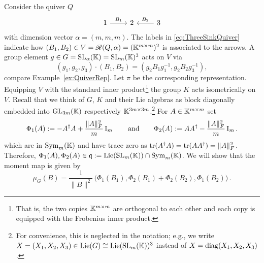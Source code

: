\begin{example} \label{ex:MomentMapQuiver}
	Consider the quiver $Q$
		\begin{equation}\label{eq:ThreeSinkQuiver}
			\begin{tikzcd}
				1 \ar[r, "B_1"] & 2 & 3 \ar[l, "B_2" ']
			\end{tikzcd}
		\end{equation}
	with dimension vector $\alpha = (m,m,m)$. The labels in \eqref{eq:ThreeSinkQuiver} indicate how $(B_1,B_2) \in V = \mathscr{R}(Q,\alpha) = (\mathbb K^{m \times m})^2$ is associated to the arrows. A group element $g \in G = \operatorname{SL}_\alpha(\mathbb K) = \operatorname{SL}_m(\mathbb K)^3$ acts on $V$
	via
		\[ (g_1,g_2,g_3) \cdot (B_1, B_2) = (g_2 B_1 g_1^{-1}, g_2 B_2 g_3^{-1}) , \]
	compare Example~\ref{ex:QuiverRep}. Let $\pi$ be the corresponding representation. 
	Equipping $V$ with the standard inner product\footnote{That is, the two copies $\mathbb K^{m \times m}$ are orthogonal to each other and each copy is equipped with the Frobenius inner product.} the group $K$ acts isometrically on $V$. Recall that we think of $G$, $K$ and their Lie algebras as block diagonally embedded into $\operatorname{GL}_{3m}(\mathbb K)$ respectively $\mathbb K^{3m \times 3m}$.\footnote{For convenience, this is neglected in the notation; e.g., we write $X = (X_1,X_2,X_3) \in \operatorname{Lie}(G) \cong \operatorname{Lie}(\operatorname{SL}_m(\mathbb K))^3$ instead of $X = \operatorname{diag}(X_1,X_2,X_3)$.}
	For $A \in \mathbb K^{m \times m}$ set
		\begin{equation}\label{eq:PhiMomentMapTau}
			\Phi_1(A) := - A^{\dagger} A + \frac{\|A\|^2_F}{m} \operatorname{I}_m  \qquad \text{and} \qquad
			\Phi_2(A) := A A^{\dagger} - \frac{\|A\|^2_F}{m} \operatorname{I}_m .
		\end{equation}
	which are in $\operatorname{Sym}_m(\mathbb K)$ and have trace zero as $\operatorname{tr}(A^{\dagger} A) = \operatorname{tr}(A A^{\dagger}) = \|A\|^2_F$. Therefore, $\Phi_1(A), \Phi_2(A) \in \mathfrak{q} := \operatorname{Lie}(\operatorname{SL}_m(\mathbb K)) \cap \operatorname{Sym}_m(\mathbb K)$.
	We will show that the moment map is given by
		\begin{equation}\label{eq:SinkMomentMap}
		\mu_G(B) = \frac{1}{\|B\|^2} \, \big( \Phi_1(B_1), \Phi_2(B_1) + \Phi_2(B_2), \Phi_1(B_2) \big) \, .
		\end{equation}
	

\end{example}

